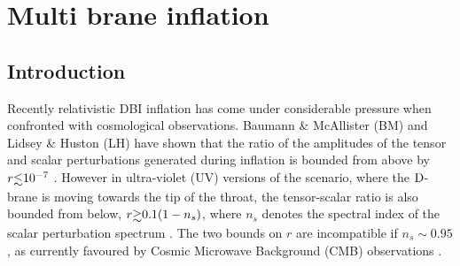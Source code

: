 \renewcommand{\CVSrevision}{\version$Id: multibrane.tex,v 1.10 2009/07/20 14:03:31 ith Exp $}

\chapter{Multi brane inflation}
\label{ch:multibrane}

\section{Introduction}
\label{sec:multi-intro}


Recently relativistic DBI inflation has come under considerable 
pressure when confronted with cosmological observations.  
Baumann \& McAllister (BM) and Lidsey \& Huston (LH) 
have shown that the ratio of the amplitudes of the 
tensor and scalar perturbations generated during 
inflation is bounded from above by $r \lsim 10^{-7}$
\cite{bmpaper,lidseyhuston}. 
However in ultra-violet (UV) versions of the scenario, where 
the ${\rm D}$-brane is moving towards the tip of the throat, the tensor-scalar 
ratio is also bounded from below, $r \gsim 0.1 (1-n_s)$, 
where $n_s$ denotes the spectral index 
of the scalar perturbation spectrum \cite{lidseyhuston}. 
The two bounds on $r$ are incompatible 
if $n_s \sim 0.95$, as currently favoured by Cosmic Microwave Background 
(CMB) observations \cite{spergel,Komatsu:2008hk}. 

